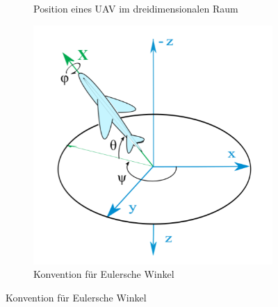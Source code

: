 \begin{figure}
\begin{subfigure}[t]{.3\textwidth}
    \caption{Position eines UAV im dreidimensionalen Raum}
    \label{fig:1b_uav}
  \end{subfigure}\hfill
  \begin{subfigure}[t]{.3\textwidth}
    \centering
    \includegraphics[width=.9\linewidth]{pic/vorwissen/1c_eulerwinkel.png}
    \caption{Konvention für Eulersche Winkel \cite{website:cosmos-indirekt-grafik}}
    \label{fig:1c_euwinkel}
  \end{subfigure}
  \label{fig:positionen}
\end{figure}
\mbox{}


